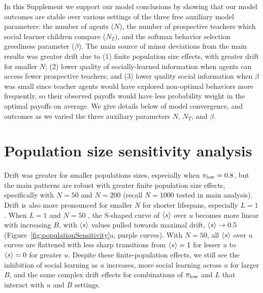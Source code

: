 \documentclass[letterpaper,11.5pt]{scrartcl}
\begin{document}
In this Supplement we support our model conclusions by showing that our model
outcomes are stable over various settings of the three free auxiliary model
parameters: the number of agents ($N$), the number of
prospective teachers which social learner children compare
($N_T$), and the softmax behavior selection greediness parameter ($\beta$).
The main source of minor deviations from the main results was greater drift
due to (1) finite population size effects, with greater drift for smaller $N$;
(2) lower quality of socially-learned information when agents can access fewer
prospective teachers; and (3) lower quality social information when $\beta$
was small since teacher agents would have explored non-optimal behaviors more
frequently, so their observed payoffs would have less probability weight in
the optimal payoffs on average. We give details below of model convergence, and
outcomes as we varied the three auxiliary parameters $N$, $N_T$, and $\beta$.


\clearpage



\newpage

\section{Population size sensitivity analysis}

Drift was greater for smaller populations sizes, especially when $\pi_{\mathrm{low}}=0.8$, but 
the main patterns are robust with greater finite population size effects, specifically
with $N=50$ and $N=200$ (recall $N=1000$ tested in main analysis). 
Drift is also more pronounced for smaller $N$
for shorter lifespans, especially $L=1$. When $L=1$ and $N=50$ , the S-shaped
curve of $\langle s \rangle$ over $u$ becomes more linear with increasing $B$, 
with $\langle s \rangle$ values pulled towards maximal drift, $\langle s \rangle \to 0.5$ (Figure~\ref{fig:populationSensitivity}a,
purple curves). With
$N=50$, all $\langle s \rangle$ over $u$ curves are flattened with less sharp transitions
from $\langle s \rangle = 1$ for lesser $u$ to $\langle s \rangle = 0$ for greater $u$. Despite
these finite-population effects, we still see the inhibition of social learning
as $u$ increases, more social learning across $u$ for larger $B$, and the
same complex drift effects for combinations of $\pi_{\mathrm{low}}$ and $L$ that interact
with $u$ and $B$ settings.
\end{document}
